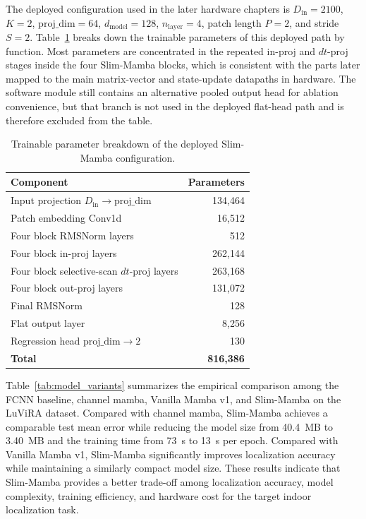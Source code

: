 \documentclass[11pt,twoside]{eitExjobb}
\begin{document}
The deployed configuration used in the later hardware chapters is
\(D_{\mathrm{in}}=2100\), \(K=2\), \(\text{proj\_dim}=64\),
\(d_{\mathrm{model}}=128\), \(n_{\mathrm{layer}}=4\), patch length \(P=2\),
and stride \(S=2\). Table~\ref{tab:slim_param_breakdown} breaks down the
trainable parameters of this deployed path by function. Most parameters are
concentrated in the repeated in-proj and \(dt\)-proj stages inside the four
Slim-Mamba blocks, which is consistent with the parts later mapped to the main
matrix-vector and state-update datapaths in hardware. The software module still
contains an alternative pooled output head for ablation convenience, but that
branch is not used in the deployed flat-head path and is therefore excluded from
the table.

\begin{table}[H]
\centering
\caption{Trainable parameter breakdown of the deployed Slim-Mamba configuration.}
\label{tab:slim_param_breakdown}
\begin{tabular}{l r}
\hline
\textbf{Component} & \textbf{Parameters} \\
\hline
Input projection \(D_{\mathrm{in}}\rightarrow\text{proj\_dim}\) & 134,464 \\
Patch embedding Conv1d & 16,512 \\
Four block RMSNorm layers & 512 \\
Four block in-proj layers & 262,144 \\
Four block selective-scan \(dt\)-proj layers & 263,168 \\
Four block out-proj layers & 131,072 \\
Final RMSNorm & 128 \\
Flat output layer & 8,256 \\
Regression head \(\text{proj\_dim}\rightarrow 2\) & 130 \\
\hline
\textbf{Total} & \textbf{816,386} \\
\hline
\end{tabular}
\end{table}


Table~\ref{tab:model_variants} summarizes the empirical comparison among the FCNN
baseline, channel mamba, Vanilla Mamba v1, and Slim-Mamba on the LuViRA dataset.
Compared with channel mamba, Slim-Mamba achieves a comparable test mean error while
reducing the model size from 40.4~MB to 3.40~MB and the training time from 73~s to 13~s
per epoch. Compared with Vanilla Mamba v1, Slim-Mamba significantly improves
localization accuracy while maintaining a similarly compact model size. These results
indicate that Slim-Mamba provides a better trade-off among localization accuracy, model
complexity, training efficiency, and hardware cost for the target indoor localization
task.
\end{document}

